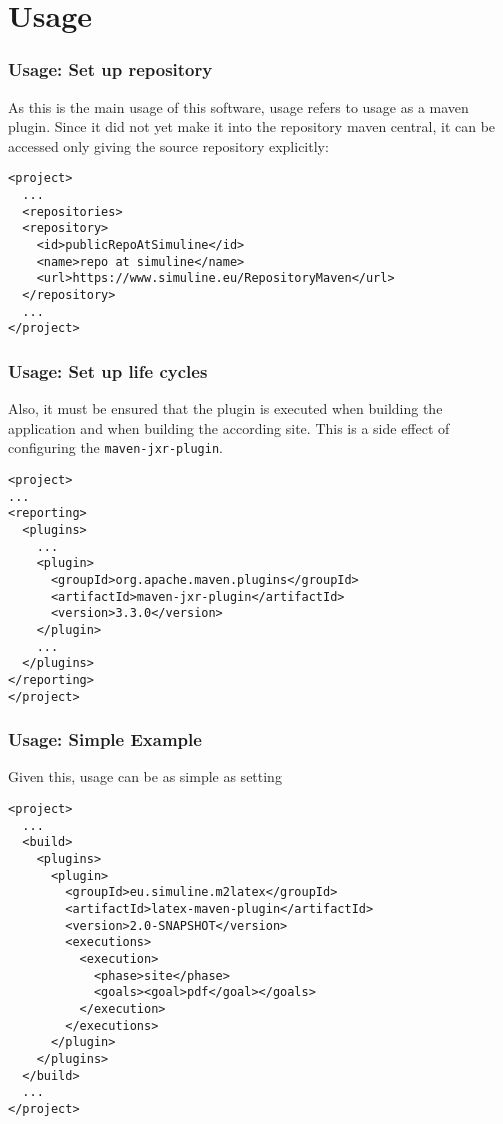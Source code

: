 \section{Usage}


\begin{frame}[fragile]
\frametitle{Usage: Set up repository}
As this is the main usage of this software, 
usage refers to usage as a maven plugin. 
Since it did not yet make it into the repository maven central, 
it can be accessed only giving the source repository explicitly: 

\begin{Verbatim}
<project>
  ...
  <repositories>
  <repository>
    <id>publicRepoAtSimuline</id>
    <name>repo at simuline</name>
    <url>https://www.simuline.eu/RepositoryMaven</url>
  </repository>
  ...
</project>
\end{Verbatim}
  
\end{frame}


\begin{frame}[fragile]
  \frametitle{Usage: Set up life cycles}
Also, it must be ensured that the plugin is executed 
when building the application and when building the according site. 
This is a side effect of configuring the \texttt{maven-jxr-plugin}. 

\begin{Verbatim}[fontsize=\scriptsize]
<project>
...
<reporting>
  <plugins>
    ...
    <plugin>
      <groupId>org.apache.maven.plugins</groupId>
      <artifactId>maven-jxr-plugin</artifactId>
      <version>3.3.0</version>
    </plugin>
    ...
  </plugins>
</reporting>
</project>
\end{Verbatim}
\end{frame}



\begin{frame}[fragile]
  \frametitle{Usage: Simple Example}
  
  Given this, usage can be as simple as setting 
\begin{Verbatim}[fontsize=\scriptsize]
<project>
  ...
  <build>
    <plugins>
      <plugin>
        <groupId>eu.simuline.m2latex</groupId>
        <artifactId>latex-maven-plugin</artifactId>
        <version>2.0-SNAPSHOT</version>
        <executions>
          <execution>
            <phase>site</phase>
            <goals><goal>pdf</goal></goals>
          </execution>
        </executions>
      </plugin>
    </plugins>
  </build>
  ...
</project>
\end{Verbatim}
\end{frame}

